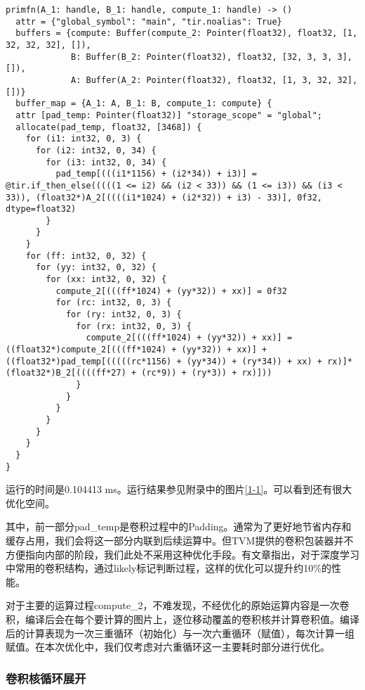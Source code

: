 \begin{lstlisting}[caption=原始循环表达式，在test1.old.ir文件中]
primfn(A_1: handle, B_1: handle, compute_1: handle) -> ()
  attr = {"global_symbol": "main", "tir.noalias": True}
  buffers = {compute: Buffer(compute_2: Pointer(float32), float32, [1, 32, 32, 32], []),
             B: Buffer(B_2: Pointer(float32), float32, [32, 3, 3, 3], []),
             A: Buffer(A_2: Pointer(float32), float32, [1, 3, 32, 32], [])}
  buffer_map = {A_1: A, B_1: B, compute_1: compute} {
  attr [pad_temp: Pointer(float32)] "storage_scope" = "global";
  allocate(pad_temp, float32, [3468]) {
    for (i1: int32, 0, 3) {
      for (i2: int32, 0, 34) {
        for (i3: int32, 0, 34) {
          pad_temp[(((i1*1156) + (i2*34)) + i3)] = @tir.if_then_else(((((1 <= i2) && (i2 < 33)) && (1 <= i3)) && (i3 < 33)), (float32*)A_2[((((i1*1024) + (i2*32)) + i3) - 33)], 0f32, dtype=float32)
        }
      }
    }
    for (ff: int32, 0, 32) {
      for (yy: int32, 0, 32) {
        for (xx: int32, 0, 32) {
          compute_2[(((ff*1024) + (yy*32)) + xx)] = 0f32
          for (rc: int32, 0, 3) {
            for (ry: int32, 0, 3) {
              for (rx: int32, 0, 3) {
                compute_2[(((ff*1024) + (yy*32)) + xx)] = ((float32*)compute_2[(((ff*1024) + (yy*32)) + xx)] + ((float32*)pad_temp[(((((rc*1156) + (yy*34)) + (ry*34)) + xx) + rx)]*(float32*)B_2[((((ff*27) + (rc*9)) + (ry*3)) + rx)]))
              }
            }
          }
        }
      }
    }
  }
}
\end{lstlisting}

运行的时间是0.104413 ms。运行结果参见附录中的图片\textcolor{MidnightBlue}{\ref{1-1}}。可以看到还有很大优化空间。

其中，前一部分pad\_temp是卷积过程中的Padding。通常为了更好地节省内存和缓存占用，我们会将这一部分内联到后续运算中。但TVM提供的卷积包装器并不方便指向内部的阶段，我们此处不采用这种优化手段。有文章指出，对于深度学习中常用的卷积结构，通过likely标记判断过程，这样的优化可以提升约10\%的性能。

对于主要的运算过程compute\_2，不难发现，不经优化的原始运算内容是一次卷积，编译后会在每个要计算的图片上，逐位移动覆盖的卷积核并计算卷积值。编译后的计算表现为一次三重循环（初始化）与一次六重循环（赋值），每次计算一组赋值。在本次优化中，我们仅考虑对六重循环这一主要耗时部分进行优化。

\subsubsection{卷积核循环展开}

